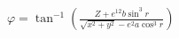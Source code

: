 \documentclass{standalone}
\begin{document}
    $\varphi = \tan^{-1}(\frac{Z + e^{12} b {\sin^3 r}}{\sqrt{x^2 + y^2} - e^2 a {\cos^3 r} })$
\end{document}
